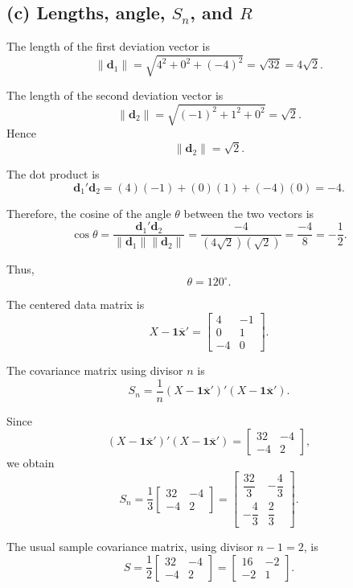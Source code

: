 \documentclass[12pt,a4paper]{article}
\newcommand{\xbar}{\overline{\mathbf{x}}}
\newcommand{\one}{\mathbf{1}}
\begin{document}
\subsection*{(c) Lengths, angle, \(S_n\), and \(R\)}

The length of the first deviation vector is
\[
\|\mathbf{d}_1\|
=
\sqrt{4^2+0^2+(-4)^2}
=
\sqrt{32}
=
\boxed{4\sqrt{2}}.
\]

The length of the second deviation vector is
\[
\|\mathbf{d}_2\|
=
\sqrt{(-1)^2+1^2+0^2}
=
\sqrt{2}.
\]
Hence
\[
\boxed{\|\mathbf{d}_2\|=\sqrt{2}}.
\]

The dot product is
\[
\mathbf{d}_1'\mathbf{d}_2
=
(4)(-1)+(0)(1)+(-4)(0)
=
-4.
\]

Therefore, the cosine of the angle \(\theta\) between the two vectors is
\[
\cos\theta
=
\frac{\mathbf{d}_1'\mathbf{d}_2}
{\|\mathbf{d}_1\|\|\mathbf{d}_2\|}
=
\frac{-4}{(4\sqrt{2})(\sqrt{2})}
=
\frac{-4}{8}
=
\boxed{-\frac12}.
\]

Thus,
\[
\boxed{\theta=120^\circ}.
\]

The centered data matrix is
\[
X-\one\xbar'
=
\begin{bmatrix}
4&-1\\
0&1\\
-4&0
\end{bmatrix}.
\]

The covariance matrix using divisor \(n\) is
\[
S_n
=
\frac{1}{n}
(X-\one\xbar')'
(X-\one\xbar').
\]

Since
\[
(X-\one\xbar')'
(X-\one\xbar')
=
\begin{bmatrix}
32&-4\\
-4&2
\end{bmatrix},
\]
we obtain
\[
S_n
=
\frac13
\begin{bmatrix}
32&-4\\
-4&2
\end{bmatrix}
=
\boxed{
\begin{bmatrix}
\dfrac{32}{3}&-\dfrac43\\[4pt]
-\dfrac43&\dfrac23
\end{bmatrix}}.
\]

The usual sample covariance matrix, using divisor \(n-1=2\), is
\[
S
=
\frac12
\begin{bmatrix}
32&-4\\
-4&2
\end{bmatrix}
=
\boxed{
\begin{bmatrix}
16&-2\\
-2&1
\end{bmatrix}}.
\]
\end{document}
